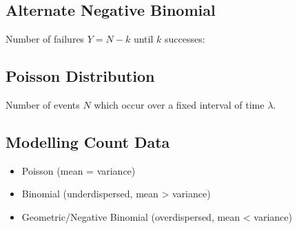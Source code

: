 \documentclass{article}
\begin{document}
\begin{minipage}{62.39259259mm}
    \subsection{Alternate Negative Binomial}
    Number of failures \(Y = N - k\) until \(k\) successes:
    \subsection{Poisson Distribution}
    Number of events \(N\) which occur over a fixed interval of time \(\lambda\).
    \subsection{Modelling Count Data}
    \begin{itemize}
        \item Poisson (mean = variance)
        \item Binomial (underdispersed, mean > variance)
        \item Geometric/Negative Binomial (overdispersed, mean < variance)
    \end{itemize}
\end{minipage}
\end{document}
